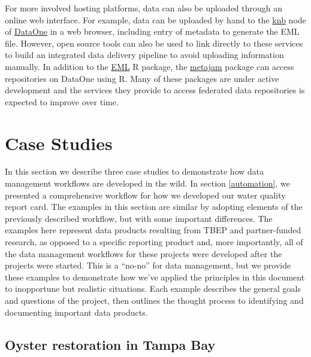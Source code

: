 \documentclass[
]{book}
\begin{document}
For more involved hosting platforms, data can also be uploaded through an online web interface. For example, data can be uploaded by hand to the \href{https://knb.ecoinformatics.org/}{knb} node of \href{https://www.dataone.org/}{DataOne} in a web browser, including entry of metadata to generate the EML file. However, open source tools can also be used to link directly to these services to build an integrated data delivery pipeline to avoid uploading information manually. In addition to the \href{https://docs.ropensci.org/EML/}{EML} R package, the \href{https://nceas.github.io/metajam/}{metajam} package can access repositories on DataOne using R. Many of these packages are under active development and the services they provide to access federated data repositories is expected to improve over time.

\chapter{Case Studies}\label{cases}

In this section we describe three case studies to demonstrate how data management workflows are developed in the wild. In section \ref{automation}, we presented a comprehensive workflow for how we developed our water quality report card. The examples in this section are similar by adopting elements of the previously described workflow, but with some important differences. The examples here represent data products resulting from TBEP and partner-funded research, as opposed to a specific reporting product and, more importantly, all of the data management workflows for these projects were developed after the projects were started. This is a ``no-no'' for data management, but we provide these examples to demonstrate how we've applied the principles in this document to inopportune but realistic situations. Each example describes the general goals and questions of the project, then outlines the thought process to identifying and documenting important data products.

\section{Oyster restoration in Tampa Bay}\label{oyster}
\end{document}
